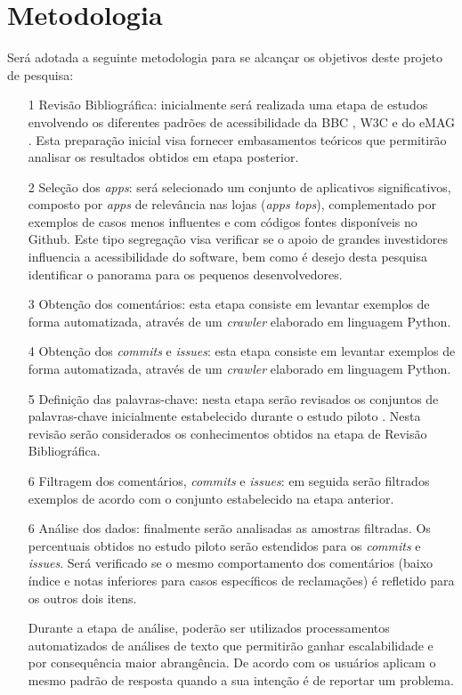 \documentclass[
	12pt,				%
	oneside,			%
	a4paper,			%
	english,			%
	brazil				%
	]{abntex2ppgsi}
\begin{document}
\section{Metodologia}
Será adotada a seguinte metodologia para se alcançar os objetivos deste projeto de pesquisa:
\begin{itemize}
	\item [1] Revisão Bibliográfica: inicialmente será realizada uma etapa de estudos envolvendo os diferentes padrões de acessibilidade da BBC \cite{bbc}, W3C \cite{wcag} e do eMAG \cite{emag}. Esta preparação inicial visa fornecer embasamentos teóricos que permitirão analisar os resultados obtidos em etapa posterior.
	\item [2] Seleção dos \textit{apps}: será selecionado um conjunto de aplicativos significativos, composto por \textit{apps} de relevância nas lojas (\textit{apps tops}), complementado por exemplos de casos menos influentes e com códigos fontes disponíveis no Github. Este tipo segregação visa verificar se o apoio de grandes investidores influencia a acessibilidade do software, bem como é desejo desta pesquisa identificar o panorama para os pequenos desenvolvedores.
	\item [3] Obtenção dos comentários: esta etapa consiste em levantar exemplos de forma automatizada, através de um \textit{crawler} elaborado em linguagem Python.
	\item [4] Obtenção dos \textit{commits} e \textit{issues}: esta etapa consiste em levantar exemplos de forma automatizada, através de um \textit{crawler} elaborado em linguagem Python.
	\item [5] Definição das palavras-chave: nesta etapa serão revisados os conjuntos de palavras-chave inicialmente estabelecido durante o estudo piloto \cite{ihc2019}. Nesta revisão serão considerados os conhecimentos obtidos na etapa de Revisão Bibliográfica.
	\item [6] Filtragem dos comentários, \textit{commits} e \textit{issues}: em seguida serão filtrados exemplos de acordo com o conjunto estabelecido na etapa anterior.
	\item [6] Análise dos dados: finalmente serão analisadas as amostras filtradas. Os percentuais obtidos no estudo piloto serão estendidos para os \textit{commits} e \textit{issues}. Será verificado se o mesmo comportamento dos comentários (baixo índice e notas inferiores para casos específicos de reclamações) é refletido para os outros dois itens.
	
	Durante a etapa de análise, poderão ser utilizados processamentos automatizados de análises de texto que permitirão ganhar escalabilidade e por consequência maior abrangência. De acordo com \cite{Panichella2015how} os usuários aplicam o mesmo padrão de resposta quando a sua intenção é de reportar um problema.	
\end{itemize}
\end{document}
